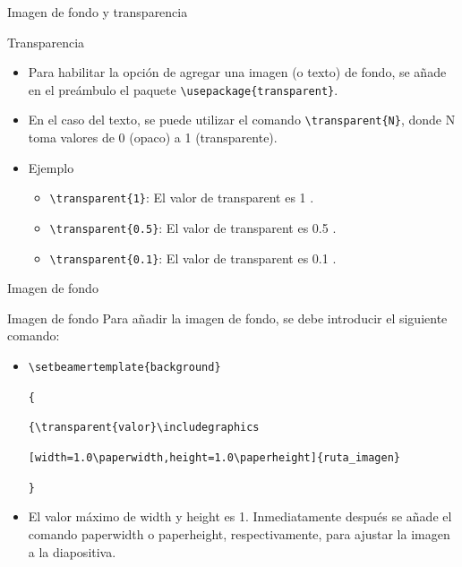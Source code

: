 \documentclass[aspectratio=169, 10pt]{beamer}
\begin{document}
\begin{frame}[fragile]{Imagen de fondo y transparencia}
    \begin{exampleblock}{Transparencia}
        \begin{itemize}
            \item Para habilitar la opción de agregar una imagen (o texto) de fondo, se añade en el preámbulo el paquete \verb|\usepackage{transparent}|. 
            \item En el caso del texto, se puede utilizar el comando \verb|\transparent{N}|, donde N toma valores de 0 (opaco) a 1 (transparente).
            \item Ejemplo 
            \begin{itemize}
                \item \verb|\transparent{1}|:  El valor de transparent es 1 .
                \item \verb|\transparent{0.5}|:  El valor de transparent es 0.5 .
                \item \verb|\transparent{0.1}|:  El valor de transparent es 0.1 .
            \end{itemize}
        \end{itemize}
        
    \end{exampleblock}


\end{frame}


\begin{frame}[fragile]{Imagen de fondo}
    \begin{alertblock}{Imagen de fondo}
    Para añadir la imagen de fondo, se debe introducir el siguiente comando:
        \begin{itemize}
            \item \verb|\setbeamertemplate{background}|
            
            \verb|{|
            
            \verb|{\transparent{valor}\includegraphics|
            
            \verb|[width=1.0\paperwidth,height=1.0\paperheight]{ruta_imagen}|
            
            \verb|}|

            \item El valor máximo de width y height es 1. Inmediatamente después se añade el comando paperwidth o paperheight, respectivamente, para ajustar la imagen a la diapositiva.
        \end{itemize}
    \end{alertblock}
    
\end{frame}
\end{document}
